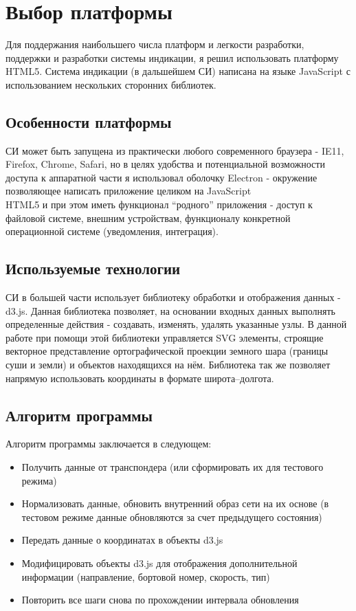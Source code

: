 \documentclass[a4paper,12pt]{report} %
\begin{document}
\section{Выбор платформы}

Для поддержания наибольшего числа платформ и легкости разработки, поддержки и
разработки системы индикации, я решил использовать платформу HTML5. Система
индикации (в дальшейшем СИ) написана на языке JavaScript с использованием
нескольких сторонних библиотек.

\subsection{Особенности платформы}

СИ может быть запущена из практически любого современного браузера - IE11,
Firefox, Chrome, Safari, но в целях удобства и потенциальной возможности доступа
к аппаратной части я использовал оболочку Electron - окружение позволяющее
написать приложение целиком на JavaScript\\HTML5 и при этом иметь функционал
``родного'' приложения - доступ к файловой системе, внешним устройствам,
функционалу конкретной операционной системе (уведомления, интеграция).

\subsection{Используемые технологии}

СИ в большей части использует библиотеку обработки и отображения данных - d3.js.
Данная библиотека позволяет, на основании входных данных выполнять определенные
действия - создавать, изменять, удалять указанные узлы. В данной работе при
помощи этой библиотеки управляется SVG элементы, строящие векторное
представление ортографической проекции земного шара (границы суши и земли) и
объектов находящихся на нём. Библиотека так же позволяет напрямую использовать
координаты в формате широта--долгота.

\subsection{Алгоритм программы}

Алгоритм программы заключается в следующем:
\begin{itemize}
\item Получить данные от транспондера (или сформировать их для тестового режима)
\item Нормализовать данные, обновить внутренний образ сети на их основе (в
  тестовом режиме данные обновляются за счет предыдущего состояния)
\item Передать данные о координатах в объекты d3.js
\item Модифицировать объекты d3.js для отображения дополнительной информации
  (направление, бортовой номер, скорость, тип)
\item Повторить все шаги снова по прохождении интервала обновления
\end{itemize}
\newpage
\end{document}
